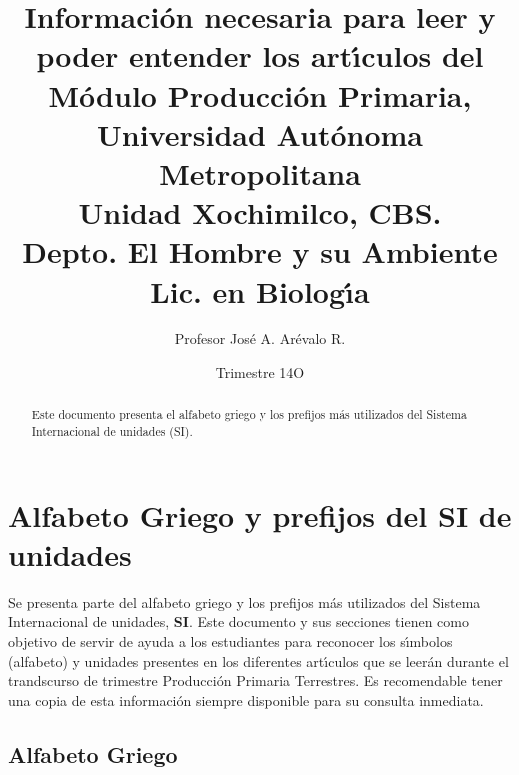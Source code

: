 \documentclass[letterpaper,spanish,12pt]{article}
\begin{document}
\title{Informaci\'{o}n necesaria para leer y poder entender los
  art\'{\i}culos del \\ 
M\'{o}dulo Producci\'{o}n Primaria, \\  
Universidad Aut\'{o}noma Metropolitana \\
Unidad Xochimilco, CBS. \\
Depto. El Hombre y su Ambiente \\
Lic. en Biolog\'{\i}a}

\author{Profesor Jos\'{e} A. Ar\'evalo R.}

\date{Trimestre 14O}

\maketitle

\begin{abstract}

Este documento presenta el alfabeto griego y los prefijos m\'{a}s
utilizados del Sistema Internacional de unidades (SI).
\end{abstract}


\section{Alfabeto Griego y prefijos del SI de unidades}

Se presenta parte del alfabeto griego y los prefijos m\'{a}s
utilizados del Sistema Internacional de unidades, \textbf{SI}. Este
documento y sus secciones tienen como objetivo de servir de ayuda a
los estudiantes para reconocer los s\'{\i}mbolos (alfabeto) y unidades
presentes en los diferentes art\'{\i}culos que se leer\'{a}n durante
el trandscurso de trimestre Producci\'{o}n Primaria Terrestres. Es
recomendable tener una copia de esta informaci\'{o}n siempre
disponible para su consulta inmediata.

\subsection*{Alfabeto Griego}
\end{document}
